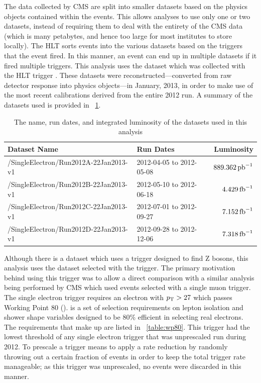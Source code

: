 The data collected by CMS are split into smaller datasets based on the physics
objects contained within the events. This allows analyses to use only one or
two datasets, instead of requiring them to deal with the entirety of the CMS
data (which is many petabytes, and hence too large for most institutes to store
locally). The HLT sorts events into the various datasets based on the triggers
that the event fired. In this manner, an event can end up in multiple datasets
if it fired multiple triggers. This analysis uses the \SingleElectron dataset
which was collected with the HLT trigger \SingleElectronTrigger. These datasets
were reconstructed---converted from raw detector response into physics
objects---in January, 2013, in order to make use of the most recent
calibrations derived from the entire 2012 run. A summary of the datasets used
is provided in \TAB~\ref{table:datasets}.

\begin{table}[h]
\centering
{}
\begin{center}
    \begin{tabular}{@{}l l r@{}}
    \toprule
    Dataset Name                          & Run Dates                & Luminosity       \\
    \midrule
    /SingleElectron/Run2012A-22Jan2013-v1 & 2012-04-05 to 2012-05-08 & $889.362 \mbox{\ensuremath{\,\text{pb}^\text{$-$1}}}$ \\
    /SingleElectron/Run2012B-22Jan2013-v1 & 2012-05-10 to 2012-06-18 & $4.429 \mbox{\ensuremath{\,\text{fb}^\text{$-$1}}}$   \\
    /SingleElectron/Run2012C-22Jan2013-v1 & 2012-07-01 to 2012-09-27 & $7.152 \mbox{\ensuremath{\,\text{fb}^\text{$-$1}}}$   \\
    /SingleElectron/Run2012D-22Jan2013-v1 & 2012-09-28 to 2012-12-06 & $7.318 \mbox{\ensuremath{\,\text{fb}^\text{$-$1}}}$   \\
    \bottomrule
    \end{tabular}
\end{center}
\caption[
    Summary of datasets.
]{
    The name, run dates, and integrated luminosity of the datasets used in this
    analysis
}
\label{table:datasets}
\end{table}

Although there is a \DoubleElectron dataset which uses a trigger designed to
find Z bosons, this analysis uses the \SingleElectron dataset selected with the
\SingleElectronTrigger trigger. The primary motivation behind using this
trigger was to allow a direct comparison with a similar \phistar analysis being
performed by CMS which used \Ztomumu events selected with a single muon
trigger. The single electron trigger requires an electron with $p_{\mathrm{T}} > 27$ which
passes Working Point 80 (\WPEighty). \WPEighty is a set of selection
requirements on lepton isolation and shower shape variables designed to be 80\%
efficient in selecting real electrons. The requirements that make up \WPEighty
are listed in \TAB~\ref{table:wp80}. This trigger had the lowest \pt threshold
of any single electron trigger that was unprescaled run during 2012. To
prescale a trigger means to apply a rate reduction by randomly throwing out a
certain fraction of events in order to keep the total trigger rate manageable;
as this trigger was unprescaled, no events were discarded in this manner.

